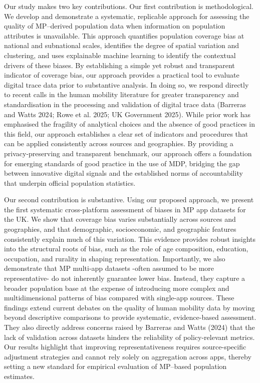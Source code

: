 \documentclass{article}
\begin{document}
Our study makes two key contributions. Our first contribution is
methodological. We develop and demonstrate a systematic, replicable
approach for assessing the quality of MP--derived population data when
information on population attributes is unavailable. This approach
quantifies population coverage bias at national and subnational scales,
identifies the degree of spatial variation and clustering, and uses
explainable machine learning to identify the contextual drivers of these
biases. By establishing a simple yet robust and transparent indicator of
coverage bias, our approach provides a practical tool to evaluate
digital trace data prior to substantive analysis. In doing so, we
respond directly to recent calls in the human mobility literature for
greater transparency and standardisation in the processing and
validation of digital trace data (Barreras and Watts 2024; Rowe et al. 2025; UK Government 2025). While prior work has
emphasised the fragility of analytical choices and the absence of good
practices in this field, our approach establishes a clear set of
indicators and procedures that can be applied consistently across
sources and geographies. By providing a privacy-preserving and
transparent benchmark, our approach offers a foundation for emerging
standards of good practice in the use of MDP, bridging the gap between
innovative digital signals and the established norms of accountability
that underpin official population statistics.

Our second contribution is substantive. Using our proposed approach, we
present the first systematic cross-platform assessment of biases in MP
app datasets for the UK. We show that coverage bias varies substantially
across sources and geographies, and that demographic, socioeconomic, and
geographic features consistently explain much of this variation. This
evidence provides robust insights into the structural roots of bias,
such as the role of age composition, education, occupation, and rurality
in shaping representation. Importantly, we also demonstrate that MP
multi-app datasets -often assumed to be more representative- do not
inherently guarantee lower bias. Instead, they capture a broader
population base at the expense of introducing more complex and
multidimensional patterns of bias compared with single-app sources.
These findings extend current debates on the quality of human mobility
data by moving beyond descriptive comparisons to provide systematic,
evidence-based assessment. They also directly address concerns raised by
Barreras and Watts (2024) that the lack of validation across datasets
hinders the reliability of policy-relevant metrics. Our results
highlight that improving representativeness requires source-specific
adjustment strategies and cannot rely solely on aggregation across apps,
thereby setting a new standard for empirical evaluation of MP--based
population estimates.
\end{document}
